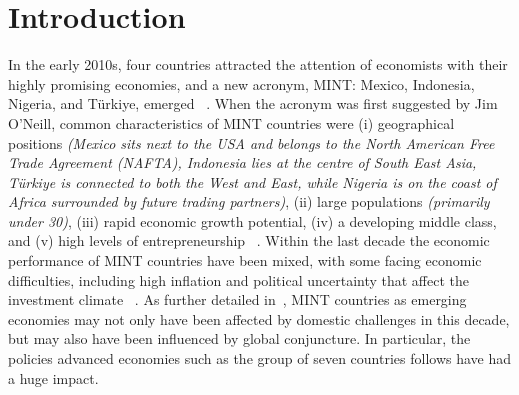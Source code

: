 \section{Introduction}
\label{sec:intro}
%
In the early 2010s, four countries attracted the attention of economists with
their highly promising economies, and a new acronym, MINT: Mexico, Indonesia,
Nigeria, and T\"{u}rkiye, emerged ~\citep{durotoye2014mint}. When the acronym
was first suggested by Jim O'Neill, common characteristics of MINT countries
were (i) geographical positions \textit{(Mexico sits next to the USA and belongs
to the North American Free Trade Agreement (NAFTA), Indonesia lies at the centre
of South East Asia, T\"{u}rkiye is connected to both the West and East, while
Nigeria is on the coast of Africa surrounded by future trading partners)}, (ii)
large populations \textit{(primarily under 30)}, (iii) rapid economic growth
potential, (iv) a developing middle class, and (v) high levels of
entrepreneurship ~\citep{Jim, Newland, Nagashybayeva}. Within the last decade
the economic performance of MINT countries have been mixed, with some facing
economic difficulties, including high inflation and political uncertainty that
affect the investment climate ~\citep{Okoroafor}. As further detailed
in~\cite{zhang2021stock,siddiqui2023assessing}, MINT countries as emerging
economies may not only have been affected by domestic challenges in this decade,
but may also have been influenced by global conjuncture. In particular, the
policies advanced economies such as the group of seven countries follows have 
had a huge impact.

